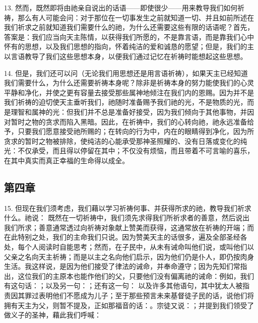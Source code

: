 13. 然而，既然即将由祂亲自说出的话语——即使很少——用来教导我们如何祈祷，那么有人可能会问：对于那位在一切事发生之前就知道一切、并且如前所述在我们祈求之前就知道我们需要什么的祂，为什么还需要这些有限的话语呢？首先，答案是：我们应当向天主陈情，以获得我们所愿的，不是靠言语，而是靠我们心中怀有的思想，以及我们思想的指向，怀着纯洁的爱和诚恳的愿望；但是，我们的主以言语教导了我们这些思想本身，以便我们通过记忆在祈祷时能想起这些思想。\par

14. 但是，我们还可以问（无论我们用思想还是用言语祈祷），如果天主已经知道我们需要什么，为什么还需要祈祷本身呢？除非是祈祷本身的努力能使我们的心灵平静和净化，并使之更有容量去接受那些属神地倾注在我们内的恩赐。因为并不是我们祈祷的迫切使天主垂听我们，祂随时准备赐予我们祂的光，不是物质的光，而是理智和属神的光：但我们并不总是准备好接受，因为我们倾向于其他事物，并因对暂时之物的贪求而陷入黑暗。因此，在祈祷中，我们的心转向祂，祂永远准备给予，只要我们愿意接受祂所赐的；在转向的行为中，内在的眼睛得到净化，因为所贪求的暂时之物被排除，使纯洁的心能承受那神圣照耀的、没有日落或变化的纯光：不仅承受，而且得以停留在其中；不仅没有烦恼，而且带着不可言喻的喜乐，在其中真实而真正幸福的生命得以成全。\par


\subsection{第四章}

15. 但现在我们须考虑，我们藉以学习祈祷何事、并获得所求的祂，教导我们祈求什么。祂说：  既然在一切祈祷中，我们须先求得我们所祈求者的善意，然后说出我们所求；善意通常透过向祈祷对象献上赞美而获得，这通常放在祈祷的开端；而在此特别之处，我们的主命我们只说。因为赞美天主的话很多，遍及全部圣经各处，每个人阅读时自能思考；然而，在子民中，从未有诫命叫他们说，或叫他们以父亲之名向天主祈祷；而是以主之名向他们启示，因为他们仍是仆人，即仍按肉身生活。我这样说，是因为他们接受了律法的诫命，并奉命遵守；因为先知们常指出，这位我们的主原本也能作他们的父，只要他们没有偏离祂的诫命：例如，我们有这句话：；以及另一句：；还有这一句： 以及许多其他语句，其中犹太人被指责因其罪过表明他们不愿成为儿子；至于那些预言未来基督徒子民的话，说他们将拥有天主为父，则暂不提及，正如那福音的话：。宗徒又说：；并提到我们领受了做义子的圣神，藉此我们呼喊：\par

